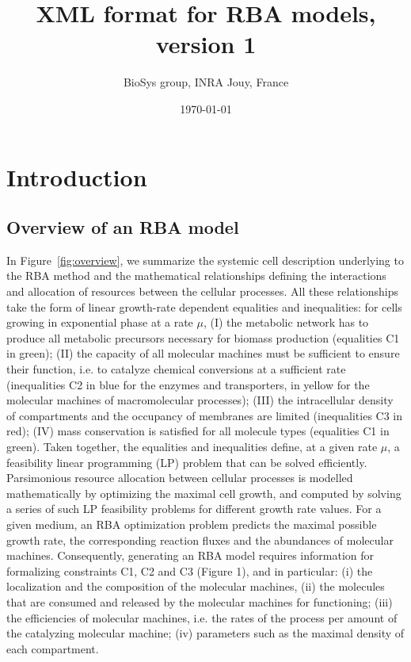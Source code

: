 \documentclass[12pt]{scrartcl}
\begin{document}
\title{XML format for RBA models, version 1}
\author{BioSys group, INRA Jouy, France}
\date{\today}

\maketitle

\newpage

\tableofcontents

\newpage

\section{Introduction}

\subsection{Overview of an RBA model}

In Figure~\ref{fig:overview}, we summarize the systemic cell description
underlying to the RBA method and the mathematical relationships defining
the interactions and allocation of resources between the cellular processes.
All these relationships take the form of linear growth-rate dependent equalities
and inequalities: for cells growing in exponential phase at a rate $\mu$,
(I) the metabolic network has to produce all metabolic precursors necessary for biomass production
(equalities C1 in green);
(II) the capacity of all molecular machines must be sufficient to ensure their function,
i.e. to catalyze chemical conversions at a sufficient rate
(inequalities C2 in blue for the enzymes and transporters,
in yellow for the molecular machines of macromolecular processes);
(III) the intracellular density of compartments and the occupancy of membranes are limited
(inequalities C3 in red);
(IV) mass conservation is satisfied for all molecule types (equalities C1 in green).
Taken together, the equalities and inequalities define,
at a given rate $\mu$,
a feasibility linear programming (LP) problem that can be solved efficiently.
Parsimonious resource allocation between cellular processes
is modelled mathematically by optimizing the maximal cell growth,
and computed by solving a series of such LP feasibility problems
for different growth rate values.
For a given medium, an RBA optimization problem predicts the maximal possible growth rate,
the corresponding reaction fluxes and the abundances of molecular machines.
Consequently, generating an RBA model requires information
for formalizing constraints C1, C2 and C3 (Figure 1), and in particular:
(i) the localization and the composition of the molecular machines,
(ii) the molecules that are consumed and released by the molecular machines for functioning;
(iii) the efficiencies of molecular machines,
i.e. the rates of the process per amount of the catalyzing molecular machine;
(iv) parameters such as the maximal density of each compartment.
\end{document}
